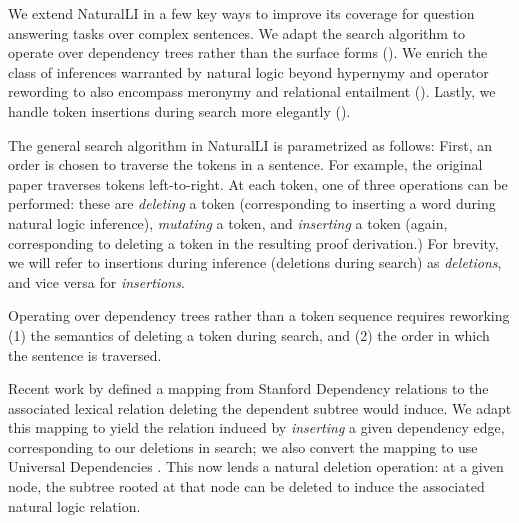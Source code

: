 We extend NaturalLI in a few key ways to improve its coverage for question
  answering tasks over complex sentences.
We adapt the search algorithm to operate over dependency
  trees rather than the surface forms ().
We enrich the class of inferences warranted by natural logic beyond
  hypernymy and operator rewording to also encompass meronymy and
  relational entailment ().
Lastly, we handle token insertions during search more elegantly
  ().

The general search algorithm in NaturalLI is parametrized as follows:
First, an order is chosen to traverse the tokens in a sentence.
For example, the original paper traverses tokens left-to-right.
At each token, one of three operations can be performed:
  these are \textit{deleting} a token
  (corresponding to inserting a word during natural logic inference),
  \textit{mutating} a token, and \textit{inserting} a token (again, corresponding
  to deleting a token in the resulting proof derivation.)
For brevity, we will refer to insertions during inference (deletions during
  search) as \textit{deletions}, and vice versa for \textit{insertions}.

%
%
Operating over dependency trees rather than a token sequence requires reworking
  (1) the semantics of deleting a token during search, and 
  (2) the order in which the sentence is traversed.


Recent work by  defined a mapping from Stanford
  Dependency relations to the associated lexical relation deleting the
  dependent subtree would induce.
We adapt this mapping to yield the relation induced by \textit{inserting} a
  given dependency edge, corresponding to our deletions in search;
  we also convert the mapping to use Universal Dependencies
  \cite{key:stanford-ud}.
This now lends a natural deletion operation: at a given node, the subtree rooted
  at that node can be deleted to induce the associated natural logic relation.


